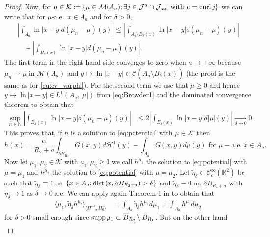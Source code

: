 \documentclass[12pt,reqno]{amsart}
\def\C{{\mathcal C}}
\def\M{{\mathcal M}}
\def\dist{{\rm dist\,}}
\def\curl{{\rm curl\,}}
\def\supp{{\rm supp\,}}
\def \p {\partial}
\def \J {{\mathcal J}}
\newcommand{\R}{\mathbb{R}}
\numberwithin{equation}{section}
\begin{document}
\begin{proof}
Now, for \(\mu \in \mathcal{K}:=\{\mu \in \M(A_a); \exists j\in \J^a\cap \J_{\text{rad}} \text{ with } \mu=\curl j\}\) we can write that for \(\mu\)-a.e.\ \(x\in A_a\) and for \(\delta>0\),
\begin{align*}
\left| \int_{A_a}\ln |x-y| d(\mu_n-\mu)(y) \right| \leq \left| \int_{A_a\setminus B_\delta(x)} \ln |x-y| d(\mu_n-\mu)(y)\right|  \\
\quad + \left| \int_{B_\delta(x)}\ln |x-y| d(\mu_n-\mu)(y)\right|.
\end{align*}
The first term in the right-hand side converges to zero when \(n \to +\infty\) because \(\mu_n \rightharpoonup \mu\) in \(\M(A_a)\) and \(y \mapsto \ln |x-y|\in \C(\overline{A_a\setminus B_\delta(x)})\) (the proof is the same as for \eqref{eq:cv_varphi}). For the second term we use that \(\mu \geq 0\) and hence  \(y \mapsto \ln |x-y| \in L^1(A_a,|\mu|)\) from \eqref{eq:Browder1} and the dominated convergence theorem  to obtain that 
\begin{align*}
\sup_{n\in \mathbb{N}} \left|\int_{B_\delta(x)} \ln |x-y| d(\mu_n-\mu)(y) \right|&\leq 2\left|\int_{B_\delta(x)}\ln |x-y| d|\mu|(y) \right| \xrightarrow[\delta \to 0]{} 0.
\end{align*}
This proves that, if \(h \) is a solution to \eqref{eq:potential} with \(\mu\in \mathcal{K}\) then
\begin{equation}\label{eq:Browder2}
 h(x)= \frac{\alpha}{R_2+a}\int_{\p B_{R_2}} G(x,y) d\mathcal{H}^1(y)-\int_{A_a} G(x,y) d \mu(y) \text{ for }\mu-\text{a.e. } x\in A_a.
\end{equation}
Now let \(\mu_1, \mu_2 \in \mathcal{K}\) with \(\mu_1,\mu_2\geq 0\) we call \(h^{\mu_1}\) the solution to \eqref{eq:potential} with \(\mu=\mu_1\) and \(h^{\mu_2}\) the solution to \eqref{eq:potential} with \(\mu=\mu_2\). Let \(\tilde{\eta}_\delta\in \C^\infty_c(\R^2)\) be such that \(\tilde{\eta}_\delta\equiv 1\) on \(\{x\in A_a; \dist(x,\p B_{R_2+a})>\delta\}\) and \(\tilde{\eta}_\delta=0\) on \(\p B_{R_2+a}\) with \(\tilde{\eta}_\delta \to 1\) as \(\delta \to 0\) a.e. We can apply again Theorem 1 in \cite{Brezis_Browder_1979} to obtain that 
\begin{align*}
\langle \mu_1, \tilde{\eta}_\delta h^{\mu_2} \rangle_{\langle {H^{-1},H^1_0}\rangle} &= \int_{A_a}\tilde{\eta}_\delta h^{\mu_2} d \mu_1 =\int_{A_a} h^{\mu_1} d\mu_2
\end{align*}
for \(\delta>0\) small enough since \(\supp \mu_1 \subset \overline{B}_{R_2}\setminus B_{R_1}\). But on the other hand
\begin{align*}

\end{align*}
\end{proof}
\end{document}
